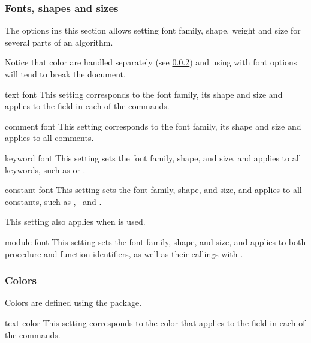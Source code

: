\documentclass[a4paper, 11pt]{article}
\begin{document}
\subsubsection{Fonts, shapes and sizes}
The options ins this section allows setting font family, shape, weight and size for several parts of an algorithm.

Notice that color are handled separately (see \cref{sec:colors}) and using  with font options will tend to break the document.

\begin{option}{text font}{}
    This setting corresponds to the font family, its shape and size and applies to the  field in each of the commands.
\end{option}

\begin{option}{comment font}{}
    This setting corresponds to the font family, its shape and size and applies to all comments.
\end{option}

\begin{option}{keyword font}{}
    This setting sets the font family, shape, and size, and applies to all keywords, such as  or .
\end{option}

\begin{option}{constant font}{}
    This setting sets the font family, shape, and size, and applies to all constants, such as \Nil, \True\ and \False.

    This setting also applies when  is used.
\end{option}

\begin{option}{module font}{}
    This setting sets the font family, shape, and size, and applies to both procedure and function identifiers, as well as their callings with .
\end{option}

\subsubsection{Colors}\label{sec:colors}
Colors are defined using the  package.

\begin{option}{text color}{}
    This setting corresponds to the color that applies to the  field in each of the commands.
\end{option}
\end{document}
